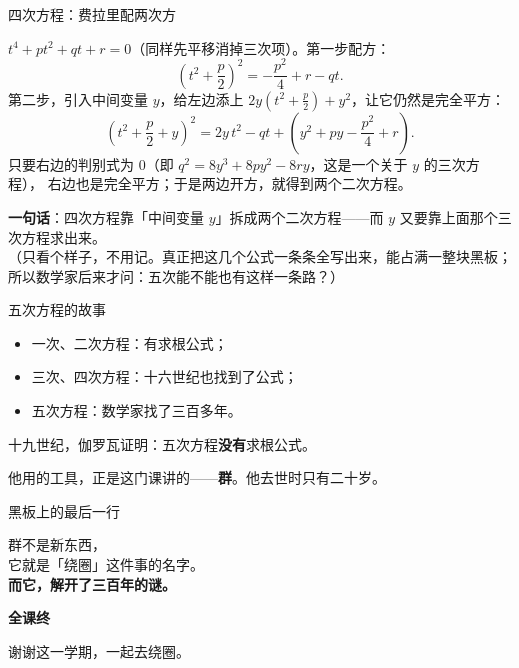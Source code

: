 \documentclass[10pt]{beamer}
\begin{document}
\begin{frame}{四次方程：费拉里配两次方}
  \small
  \setlength{\abovedisplayskip}{1pt plus 1pt}
  \setlength{\belowdisplayskip}{1pt plus 1pt}
  \setlength{\abovedisplayshortskip}{1pt}
  \setlength{\belowdisplayshortskip}{1pt}
  \begin{example}[一元四次方程]
    \(t^4+pt^2+qt+r=0\)（同样先平移消掉三次项）。第一步配方：
    \[ \left(t^2+\frac{p}{2}\right)^2=-\frac{p^2}{4}+r-qt. \]
    第二步，引入中间变量 \(y\)，给左边添上 \(2y\left(t^2+\frac p2\right)+y^2\)，让它仍然是完全平方：
    \[ \left(t^2+\frac{p}{2}+y\right)^2
       =2y\,t^2-qt+\left(y^2+py-\frac{p^2}{4}+r\right). \]
    只要右边的判别式为 \(0\)（即 \(q^2=8y^3+8py^2-8ry\)，这是一个关于 \(y\) 的三次方程），
    右边也是完全平方；于是两边开方，就得到两个二次方程。
  \end{example}
  \begin{center}
    \small\textbf{一句话}：四次方程靠「中间变量 \(y\)」拆成两个二次方程——而 \(y\) 又要靠上面那个三次方程求出来。\\
    \scriptsize（只看个样子，不用记。真正把这几个公式一条条全写出来，能占满一整块黑板；所以数学家后来才问：五次能不能也有这样一条路？）
  \end{center}
\end{frame}

\begin{frame}{五次方程的故事}
  \begin{itemize}
    \item 一次、二次方程：有求根公式；
    \item 三次、四次方程：十六世纪也找到了公式；
    \item 五次方程：数学家找了三百多年。
  \end{itemize}
  \pause
  \begin{center}
    {\large 十九世纪，伽罗瓦证明：五次方程\textbf{没有}求根公式。}
  \end{center}
  \pause
  \begin{center}
    {\large 他用的工具，正是这门课讲的——\textbf{群}。\quad 他去世时只有二十岁。}
  \end{center}
\end{frame}

\begin{frame}{黑板上的最后一行}
  \begin{center}
    \vspace{0.5cm}
    {\Large 群不是新东西，}\\[0.5em]
    {\Large 它就是「绕圈」这件事的名字。}\\[1.2em]
    \pause
    {\Large\textcolor{textgreen}{\bfseries 而它，解开了三百年的谜。}}
  \end{center}
\end{frame}

\begin{frame}
  \begin{center}
    \vspace{1.6cm}
    {\Large\textcolor{textgreen}{\bfseries 全课终}}

    \vspace{1.0cm}
    {\large\textcolor{accentgreen}{谢谢这一学期，一起去绕圈。}}
  \end{center}
\end{frame}
\end{document}
